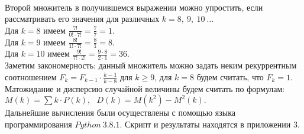 \documentclass{article}
\begin{document}
\vspace{\baselineskip}
\\
Второй множитель в получившемся выражении можно упростить, если рассматривать его значения для различных \begin{math}
 k = 8, \ 9, \ 10 \ ...
\end{math}
\\
Для \begin{math}
 k = 8
\end{math} имеем \begin{math}
\displaystyle\frac{7!}{0! \cdot 7!} = \displaystyle\frac{7}{7} = 1
\end{math}. 
\\
Для \begin{math}
 k = 9
\end{math} имеем \begin{math}
\displaystyle\frac{8!}{1! \cdot 7!} = \displaystyle\frac{8}{1} = 8.
\end{math}
\\
Для \begin{math}
 k = 10
\end{math} имеем \begin{math}
\displaystyle\frac{9!}{7! \cdot 2!} = \displaystyle\frac{9 \cdot 8 }{2 \cdot 1} = 36.
\end{math}
\vspace{\baselineskip}
\\
Заметим закономерность: данный множитель можно задать неким рекуррентным соотношением \begin{math}
 F_{k} = F_{k-1} \cdot \displaystyle\frac{k-1}{k-8} 
\end{math} для \begin{math}
 k \geq 9
\end{math}, для \begin{math}
 k = 8 
\end{math} будем считать, что 
\begin{math}
 F_{k} = 1.
\end{math}
\vspace{\baselineskip}
\\
Матожидание и дисперсию случайной величины будем считать по формулам:
\vspace{\baselineskip}
\\
\begin{math}
M(k) = \sum k \cdot P(k), \ \ \  D(k) = M(k^2) - M^2(k).
\end{math}
\vspace{\baselineskip}
\\
Дальнейшие вычисления были осуществлены с помощью языка программирования \begin{math}
 Python \ 3.8.1
\end{math}. Скрипт и результаты находятся в приложении 3.
\vspace{\baselineskip}




\end{document}
